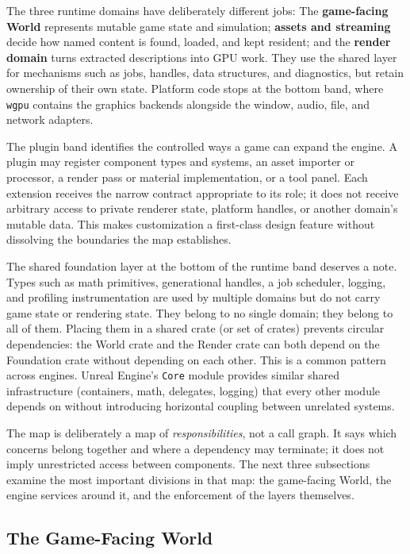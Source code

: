 \documentclass[
  11pt,
  letterpaper,
  DIV=11,
  numbers=noendperiod,
  twoside,
  open=right]{scrreprt}
\begin{document}
The three runtime domains have deliberately different jobs: The
\textbf{game-facing World} represents mutable game state and simulation;
\textbf{assets and streaming} decide how named content is found, loaded,
and kept resident; and the \textbf{render domain} turns extracted
descriptions into GPU work. They use the shared layer for mechanisms
such as jobs, handles, data structures, and diagnostics, but retain
ownership of their own state. Platform code stops at the bottom band,
where \texttt{wgpu} contains the graphics backends alongside the window,
audio, file, and network adapters.

The plugin band identifies the controlled ways a game can expand the
engine. A plugin may register component types and systems, an asset
importer or processor, a render pass or material implementation, or a
tool panel. Each extension receives the narrow contract appropriate to
its role; it does not receive arbitrary access to private renderer
state, platform handles, or another domain's mutable data. This makes
customization a first-class design feature without dissolving the
boundaries the map establishes.

The shared foundation layer at the bottom of the runtime band deserves a
note. Types such as math primitives, generational handles, a job
scheduler, logging, and profiling instrumentation are used by multiple
domains but do not carry game state or rendering state. They belong to
no single domain; they belong to all of them. Placing them in a shared
crate (or set of crates) prevents circular dependencies: the World crate
and the Render crate can both depend on the Foundation crate without
depending on each other. This is a common pattern across engines. Unreal
Engine's \texttt{Core} module provides similar shared infrastructure
(containers, math, delegates, logging) that every other module depends
on without introducing horizontal coupling between unrelated systems.

The map is deliberately a map of \emph{responsibilities}, not a call
graph. It says which concerns belong together and where a dependency may
terminate; it does not imply unrestricted access between components. The
next three subsections examine the most important divisions in that map:
the game-facing World, the engine services around it, and the
enforcement of the layers themselves.

\subsection{The Game-Facing World}\label{the-game-facing-world}
\end{document}
